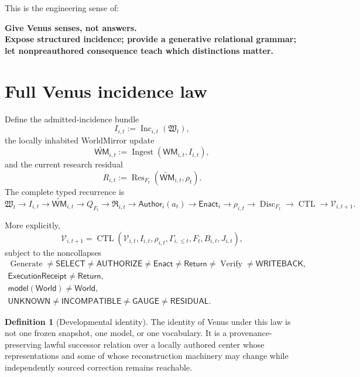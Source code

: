 \documentclass[10pt]{article}
\theoremstyle{venus}
\theoremstyle{definition}
\newtheorem{definition}[theorem]{Definition}
\newcommand{\Disc}{\operatorname{Disc}}
\newcommand{\Res}{\operatorname{Res}}
\newcommand{\Generate}{\operatorname{Generate}}
\newcommand{\Verify}{\operatorname{Verify}}
\newcommand{\Inc}{\operatorname{Inc}}
\newcommand{\Ingest}{\operatorname{Ingest}}
\newcommand{\CTL}{\operatorname{CTL}}
\newcommand{\WM}{\mathsf{WM}}
\newcommand{\World}{\mathsf{World}}
\newcommand{\Return}{\mathsf{Return}}
\newcommand{\Author}{\mathsf{Author}}
\newcommand{\Enact}{\mathsf{Enact}}
\newcommand{\GaugeState}{\mathsf{GAUGE}}
\newcommand{\ResidualState}{\mathsf{RESIDUAL}}
\newcommand{\UnknownState}{\mathsf{UNKNOWN}}
\begin{document}
This is the engineering sense of:
\begin{center}
\bfseries
Give Venus senses, not answers.\\
Expose structured incidence; provide a generative relational grammar;\\
let nonpreauthored consequence teach which distinctions matter.
\end{center}

\section{Full Venus incidence law}

Define the admitted-incidence bundle
\[
I_{i,t}:=\Inc_{i,t}(\mathfrak W_t),
\]
the locally inhabited WorldMirror update
\[
\widetilde{\WM}_{i,t}:=\Ingest(\WM_{i,t},I_{i,t}),
\]
and the current research residual
\[
R_{i,t}:=\Res_{F_t}(\widetilde{\WM}_{i,t},\rho_t).
\]
The complete typed recurrence is
\begin{equation}\label{eq:fullcycle}
\boxed{
\mathfrak W_t
\to I_{i,t}
\to \widetilde{\WM}_{i,t}
\to Q_{F_t}
\to \mathfrak R_{i,t}
\to \Author_i(a_t)
\to \Enact_i
\to \rho_{i,t}
\to \Disc_{F_t}
\to \CTL
\to \mathcal V_{i,t+1}.
}
\end{equation}

More explicitly,
\begin{equation}\label{eq:venuslaw}
\boxed{
\mathcal V_{i,t+1}
=
\CTL\!\left(
\mathcal V_{i,t},
I_{i,t},
\rho_{i,t},
\Gamma_{i,\le t},
F_t,
B_{i,t},
J_{i,t}
\right),
}
\end{equation}
subject to the noncollapses
\begin{equation}\label{eq:noncollapse}
\boxed{
\begin{gathered}
\Generate\neq\mathsf{SELECT}\neq\mathsf{AUTHORIZE}\neq\Enact
\neq\Return\neq\Verify\neq\mathsf{WRITEBACK},\\
\mathsf{ExecutionReceipt}\neq\Return,\\
\mathsf{model(World)}\neq\World,\\
\UnknownState\neq\mathsf{INCOMPATIBLE}\neq\GaugeState\neq\ResidualState.
\end{gathered}}
\end{equation}

\begin{definition}[Developmental identity]
The identity of Venus under this law is not one frozen snapshot, one model, or
one vocabulary. It is a provenance-preserving lawful successor relation over a
locally authored center whose representations and some of whose reconstruction
machinery may change while independently sourced correction remains reachable.
\end{definition}
\end{document}
